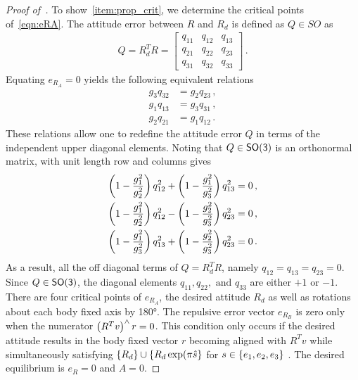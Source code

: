 \documentclass[letterpaper, 10 pt, conference]{ieeeconf}  %
\begin{document}
\begin{proof}[Proof of~]
To show~\cref{item:prop_crit}, we determine the critical points of~\cref{eqn:eRA}.
The attitude error between \( R \) and \( R_d \) is defined as \( Q \in SO \) as
\begin{align*}
	Q = R_d^T R = 
	\begin{bmatrix}
		q_{11} & q_{12} & q_{13} \\
		q_{21} & q_{22} & q_{23} \\
		q_{31} & q_{32} & q_{33}
	\end{bmatrix} \, .
\end{align*}
Equating \( e_{R_{A}} = 0 \) yields the following equivalent relations
\begin{subequations}
\begin{align}
	g_3 q_{32} &= g_2 q_{23} \, , \\
	g_1 q_{13} &= g_3 q_{31} \, , \\
	g_2 q_{21} &= g_1 q_{12} \, .
\end{align}
\end{subequations}
These relations allow one to redefine the attitude error \( Q \) in terms of the independent upper diagonal elements.
Noting that \( Q \in \mathsf{SO(3)} \) is an orthonormal matrix, with unit length row and columns gives
\begin{subequations}
\begin{align}
	\left( 1 - \frac{g_1^2}{g_2^2} \right) q_{12}^2 + \left( 1 - \frac{g_1^2}{g_3^2} \right)q_{13}^2 &= 0 \, , \\
	\left( 1 - \frac{g_1^2}{g_2^2} \right) q_{12}^2 - \left( 1 - \frac{g_2^2}{g_3^2} \right) q_{23}^2 &= 0 \, , \\
	\left( 1-\frac{g_1^2}{g_3^2} \right) q_{13}^2 + \left( 1 - \frac{g_2^2}{g_3^2} \right) q_{23}^2 &= 0 \, .
\end{align}
\end{subequations}
As a result, all the off diagonal terms of \( Q = R_d^T R \), namely \( q_{12}= q_{13} = q_{23} = 0 \).
Since \( Q \in \mathsf{SO(3)} \), the diagonal elements \( q_{11}, q_{22}, \text{ and } q_{33} \) are either \( +1 \) or \(-1\).
There are four critical points of \( e_{R_A} \), the desired attitude \( R_d \) as well as rotations about each body fixed axis by \ang{180}.
The repulsive error vector \( e_{R_{B}} \) is zero only when the numerator \( \left( R^T v \right)^\wedge r = 0 \). 
This condition only occurs if the desired attitude results in the body fixed vector \( r \) becoming aligned with \(R^T v \) while simultaneously satisfying \(\left\{ R_d \right\} \cup \left\{ R_d \exp(\pi \hat{s} \right\} \) for \( s \in \left\{ e_1, e_2, e_3 \right\} \) .
The desired equilibrium is \( e_R = 0 \) and \( A = 0\).
\end{proof}
\end{document}
